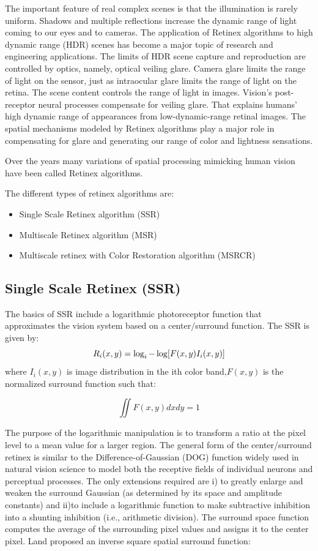 The important feature of real complex scenes is that the illumination is rarely uniform. Shadows and multiple reflections increase the dynamic range of light coming to our eyes and to cameras. The application of Retinex algorithms to high dynamic range (HDR) scenes has become a major topic of research and engineering applications. The limits of HDR scene capture and reproduction are controlled by optics, namely, optical veiling glare. Camera glare limits the range of light on the sensor, just as intraocular glare limits the range of light on the retina. The scene content controls the range of light in images. Vision’s post-receptor neural processes compensate for veiling glare. That explains humans’ high dynamic range of appearances from low-dynamic-range retinal images. The spatial mechanisms modeled by Retinex algorithms play a major role in compensating for glare and generating our range of color and lightness sensations.

Over the years many variations of spatial processing mimicking human vision have been called Retinex algorithms\cite{retinex}.

The different types of retinex algorithms are: 
\begin{itemize}
		\item Single Scale Retinex algorithm (SSR)
		\item Multiscale Retinex algorithm (MSR)
		\item Multiscale retinex with Color Restoration algorithm (MSRCR) 
\end{itemize}
	
\subsection{Single Scale Retinex (SSR)}
The basics of SSR include a logarithmic photoreceptor function that approximates the vision system based on a center/surround function\cite{ssr}. The SSR is given by:
\begin{equation}
	R_{i}(x,y)=\log_{i}-\log[F(x,y)\*I_{i}(x,y)]
\end{equation}
where $I_{i} (x,y)$ is image distribution in the ith color band,$F(x,y)$ is the normalized surround function such that:

\begin{equation}
	\iint F(x,y)dxdy=1
\end{equation}

The purpose of the logarithmic manipulation is to transform a ratio at the pixel level to a mean value for a larger region\cite{ssr}. The general form of the center/surround retinex is similar to the Difference-of-Gaussian (DOG) function widely used in natural vision science to model both the receptive fields of individual neurons and perceptual processes\cite{ssr}. The only extensions required are i) to greatly enlarge and weaken the surround Gaussian (as determined by its space and amplitude constants) and ii)to include a logarithmic function to make subtractive inhibition into a shunting inhibition (i.e., arithmetic division). The surround space function computes the average of the surrounding pixel values and assigns it to the center pixel. Land \cite{retinex} proposed an inverse square spatial surround function\cite{ssr}:

